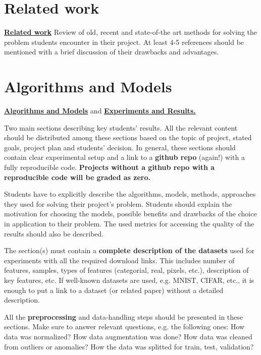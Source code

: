 \documentclass{article}
\begin{document}
\section{Related work}\label{related_work}

\underline{\textbf{Related work}} Review of old, recent and state-of-the art methods for solving the problem students encounter in their project. At least 4-5 references should be mentioned with a brief discussion of their drawbacks and advantages.

\section{Algorithms and Models}\label{algorithms_and_models}

\underline{\textbf{Algorithms and Models}} and \underline{\textbf{Experiments and Results.}}

Two main sections describing key students' results. All the relevant content should be distributed among these sections based on the topic of project, stated goals, project plan and students' decision. In general, these sections should contain clear experimental setup and a  link to a \textbf{github repo} (again!) with a fully reproducible code. \textbf{Projects without a github repo with a reproducible code will be graded as zero.}

Students have to explicitly describe the algorithms, models, methods, approaches they used for solving their project's problem. Students should explain the motivation for choosing the models, possible benefits and drawbacks of the choice in application to their problem. The used metrics for accessing the quality of the results should also be described.

The section(s) must contain a \textbf{complete description of the datasets} used for experiments with all the required download links. This includes number of features, samples, types of features (categorial, real, pixels, etc.), description of key features, etc. If well-known datasets are used, e.g. MNIST, CIFAR, etc., it is enough to put a link to a dataset (or related paper) without a detailed description.

All the \textbf{preprocessing} and data-handling steps should be presented in these sections. Make sure to answer relevant questions, e.g. the following ones: How data was normalized? How data augmentation was done? How data was cleaned from outliers or anomalies? How the data was splitted for train, test, validation?
\end{document}
